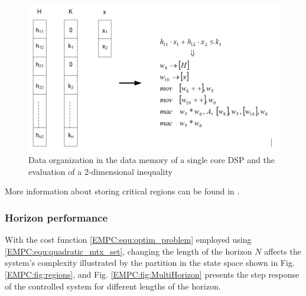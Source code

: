     \begin{figure}[!ht]
        \centering
        \includegraphics[width=\textwidth]{EMPC_PNG_Pics/Memory.png}
        \caption{Data organization in the data memory of a single core DSP and the evaluation of a 2-dimensional inequality}
        \label{EMPC:fig:Memory}
    \end{figure}

    More information about storing critical regions can be found in .

    \subsubsection{Horizon performance}\label{EMPC:sec:Performance}

    With the cost function \ref{EMPC:equ:optim_problem} employed using \ref{EMPC:equ:quadratic_mtx_set}, changing the length of the horizon $N$ affects the system's complexity illustrated by the partition in the state space shown in Fig. \ref{EMPC:fig:regions}, and Fig. \ref{EMPC:fig:MultiHorizon} presents the step response of the controlled system for different lengths of the horizon. 

